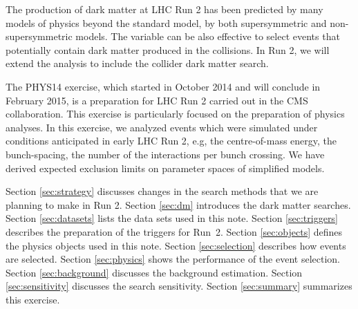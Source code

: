 The production of dark matter at LHC Run 2 has been predicted by many
models of physics beyond the standard model, by both supersymmetric and
non-supersymmetric models. The variable \alphat can be also effective to
select events that potentially contain dark matter produced in the
collisions. In Run 2, we will extend the \alphat analysis to include the
collider dark matter search.

The PHYS14 exercise, which started in October 2014 and will conclude in
February 2015, is a preparation for LHC Run 2 carried out in the CMS
collaboration. This exercise is particularly focused on the preparation
of physics analyses. In this exercise, we analyzed events which were
simulated under conditions anticipated in early LHC Run 2, e.g, the
centre-of-mass energy, the bunch-spacing, the number of the interactions
per bunch crossing. We have derived expected exclusion limits on
parameter spaces of simplified models.

Section \ref{sec:strategy} discusses changes in the search methods that
we are planning to make in Run 2. Section \ref{sec:dm} introduces the
dark matter searches. Section \ref{sec:datasets} lists the data sets
used in this note. Section \ref{sec:triggers} describes the preparation
of the triggers for Run~2. Section \ref{sec:objects} defines the physics
objects used in this note. Section \ref{sec:selection} describes how
events are selected. Section \ref{sec:physics} shows the performance of
the event selection. Section \ref{sec:background} discusses the
background estimation. Section \ref{sec:sensitivity} discusses the
search sensitivity. Section \ref{sec:summary} summarizes this exercise.




